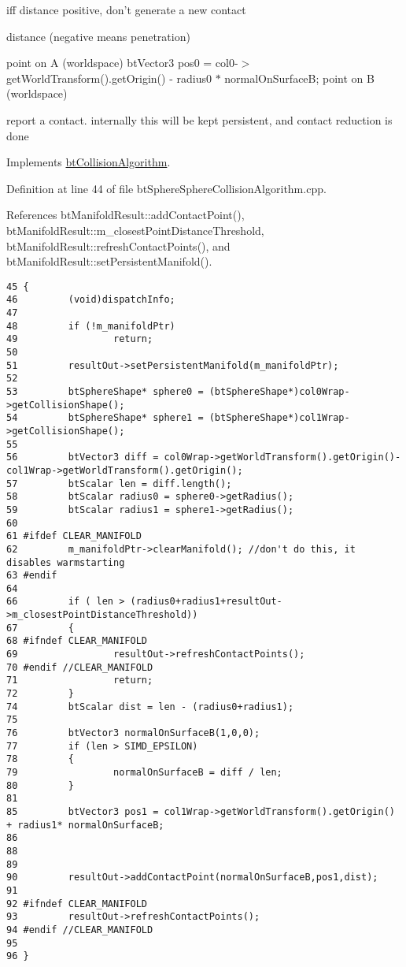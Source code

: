 iff distance positive, don't generate a new contact

distance (negative means penetration)

point on A (worldspace) btVector3 pos0 = col0-$>$getWorldTransform().getOrigin() - radius0 $\ast$ normalOnSurfaceB; point on B (worldspace)

report a contact. internally this will be kept persistent, and contact reduction is done 

Implements \hyperlink{classbt_collision_algorithm}{btCollisionAlgorithm}.

Definition at line 44 of file btSphereSphereCollisionAlgorithm.cpp.

References btManifoldResult::addContactPoint(), btManifoldResult::m\_\-closestPointDistanceThreshold, btManifoldResult::refreshContactPoints(), and btManifoldResult::setPersistentManifold().

\begin{Code}\begin{verbatim}45 {
46         (void)dispatchInfo;
47 
48         if (!m_manifoldPtr)
49                 return;
50 
51         resultOut->setPersistentManifold(m_manifoldPtr);
52 
53         btSphereShape* sphere0 = (btSphereShape*)col0Wrap->getCollisionShape();
54         btSphereShape* sphere1 = (btSphereShape*)col1Wrap->getCollisionShape();
55 
56         btVector3 diff = col0Wrap->getWorldTransform().getOrigin()-  col1Wrap->getWorldTransform().getOrigin();
57         btScalar len = diff.length();
58         btScalar radius0 = sphere0->getRadius();
59         btScalar radius1 = sphere1->getRadius();
60 
61 #ifdef CLEAR_MANIFOLD
62         m_manifoldPtr->clearManifold(); //don't do this, it disables warmstarting
63 #endif
64 
66         if ( len > (radius0+radius1+resultOut->m_closestPointDistanceThreshold))
67         {
68 #ifndef CLEAR_MANIFOLD
69                 resultOut->refreshContactPoints();
70 #endif //CLEAR_MANIFOLD
71                 return;
72         }
74         btScalar dist = len - (radius0+radius1);
75 
76         btVector3 normalOnSurfaceB(1,0,0);
77         if (len > SIMD_EPSILON)
78         {
79                 normalOnSurfaceB = diff / len;
80         }
81 
85         btVector3 pos1 = col1Wrap->getWorldTransform().getOrigin() + radius1* normalOnSurfaceB;
86 
88         
89         
90         resultOut->addContactPoint(normalOnSurfaceB,pos1,dist);
91 
92 #ifndef CLEAR_MANIFOLD
93         resultOut->refreshContactPoints();
94 #endif //CLEAR_MANIFOLD
95 
96 }
\end{verbatim}
\end{Code}




